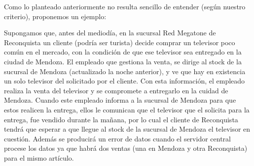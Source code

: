Como lo planteado anteriormente no resulta sencillo de entender (según nuestro
criterio), proponemos un ejemplo:

Supongamos que, antes del mediodía, en la sucursal Red Megatone de Reconquista
un cliente (podría ser turista) decide comprar un televisor poco común en el
mercado, con la condición de que ese televisor sea entregado en la ciudad de
Mendoza. El empleado que gestiona la venta, se dirige al stock de la sucursal
de Mendoza (actualizado la noche anterior), y ve que hay en existencia un solo
televisor del solicitado por el cliente. Con esta información, el empleado
realiza la venta del televisor y se compromete a entregarlo en la cuidad de
Mendoza. Cuando este empleado informa a la sucursal de Mendoza para que estos
realicen la entrega, ellos le comunican que el televisor que el solicita para
la entrega, fue vendido durante la mañana, por lo cual el cliente de
Reconquista tendrá que esperar a que llegue al stock de la sucursal de Mendoza
el televisor en cuestión. Además se producirá un error de datos cuando el
servidor central procese los datos ya que habrá dos ventas (una en Mendoza y
otra Reconquista) para el mismo artículo.

\pagebreak
